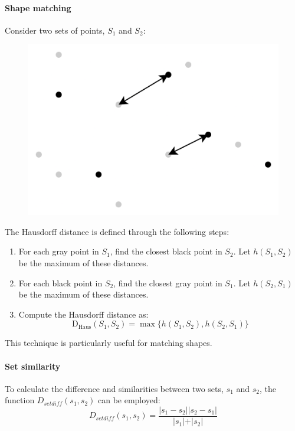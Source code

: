 \paragraph*{Shape matching}
Consider two sets of points, $S_1$ and $S_2$:
\begin{figure}[H]
    \centering
    \includegraphics[width=0.5\linewidth]{images/hd.png}
\end{figure}
The Hausdorff distance is defined through the following steps:
\begin{enumerate}
    \item For each gray point in $S_1$, find the closest black point in $S_2$. 
        Let $h(S_1,S_2)$ be the maximum of these distances.
    \item For each black point in $S_2$, find the closest gray point in $S_1$. 
        Let $h(S_2,S_1)$ be the maximum of these distances.
    \item Compute the Hausdorff distance as:
        \[\text{D}_{\text{Haus}}(S_1,S_2) = \max\{ h(S_1,S_2),h(S_2,S_1)\}\]
\end{enumerate}
This technique is particularly useful for matching shapes.

\paragraph*{Set similarity}
To calculate the difference and similarities between two sets, $s_1$ and $s_2$, the function $D_{setdiff}(s_1,s_2)$ can be employed: 
\[D_{setdiff}(s_1,s_2)=\dfrac{\left\lvert s_1 - s_2 \right\rvert \left\lvert s_2 - s_1 \right\rvert }{\left\lvert s_1 \left\lvert +\right\rvert s_2 \right\rvert}\]

